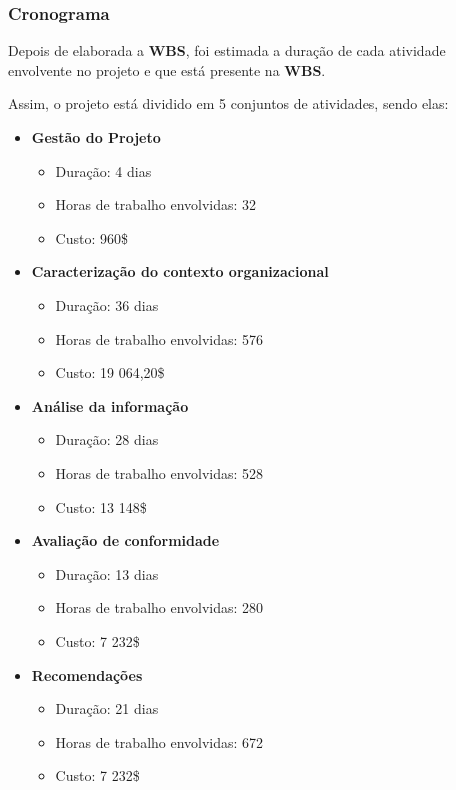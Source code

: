 \subsubsection{Cronograma}

Depois de elaborada a \textbf{WBS}, foi estimada a duração de cada atividade envolvente no projeto e que está presente na \textbf{WBS}.

Assim, o projeto está dividido em 5 conjuntos de atividades, sendo elas:

\begin{itemize}
	\item \textbf{Gestão do Projeto}
		\begin{itemize}
			\item Duração: 4 dias
			\item Horas de trabalho envolvidas: 32
			\item Custo: 960\$
		\end{itemize}
	\item \textbf{Caracterização do contexto organizacional}
		\begin{itemize}
			\item Duração: 36 dias
			\item Horas de trabalho envolvidas: 576
			\item Custo: 19 064,20\$
		\end{itemize}
	\item \textbf{Análise da informação}
		\begin{itemize}
			\item Duração: 28 dias
			\item Horas de trabalho envolvidas: 528
			\item Custo: 13 148\$
		\end{itemize}
	\item \textbf{Avaliação de conformidade}
		\begin{itemize}
			\item Duração: 13 dias
			\item Horas de trabalho envolvidas: 280
			\item Custo: 7 232\$
    \end{itemize}
    \item \textbf{Recomendações}
		\begin{itemize}
      \item Duração: 21 dias
      \item Horas de trabalho envolvidas: 672
			\item Custo: 7 232\$
		\end{itemize}
\end{itemize}
